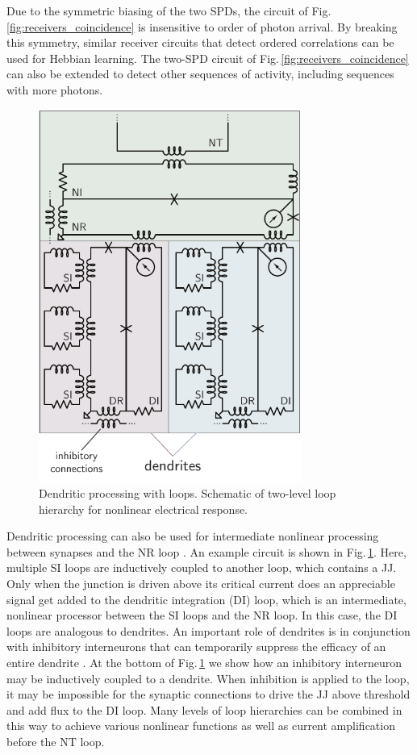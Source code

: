 \documentclass[aip,amsmath,amssymb,reprint,nofootinbib]{revtex4-1}
\begin{document}
Due to the symmetric biasing of the two SPDs, the circuit of Fig.\,\ref{fig:receivers_coincidence} is insensitive to order of photon arrival. By breaking this symmetry, similar receiver circuits that detect ordered correlations can be used for Hebbian learning. The two-SPD circuit of Fig.\,\ref{fig:receivers_coincidence} can also be extended to detect other sequences of activity, including sequences with more photons. 
\begin{figure}[t!]
	\centerline{\includegraphics[width=8.6cm]{_receivers_dendriticProcessing_small.pdf}}
	\caption{\label{fig:receivers_dendriticProcessing} Dendritic processing with loops. Schematic of two-level loop hierarchy for nonlinear electrical response.}
\end{figure}

Dendritic processing can also be used for intermediate nonlinear processing between synapses and the NR loop \cite{sava2017}. An example circuit is shown in Fig.\,\ref{fig:receivers_dendriticProcessing}. Here, multiple SI loops are inductively coupled to another loop, which contains a JJ. Only when the junction is driven above its critical current does an appreciable signal get added to the dendritic integration (DI) loop, which is an intermediate, nonlinear processor between the SI loops and the NR loop. In this case, the DI loops are analogous to dendrites. An important role of dendrites is in conjunction with inhibitory interneurons that can temporarily suppress the efficacy of an entire dendrite \cite{budr2004,bu2006,robu2015}. At the bottom of Fig.\,\ref{fig:receivers_dendriticProcessing} we show how an inhibitory interneuron may be inductively coupled to a dendrite. When inhibition is applied to the loop, it may be impossible for the synaptic connections to drive the JJ above threshold and add flux to the DI loop. Many levels of loop hierarchies can be combined in this way to achieve various nonlinear functions as well as current amplification before the NT loop.
\end{document}
